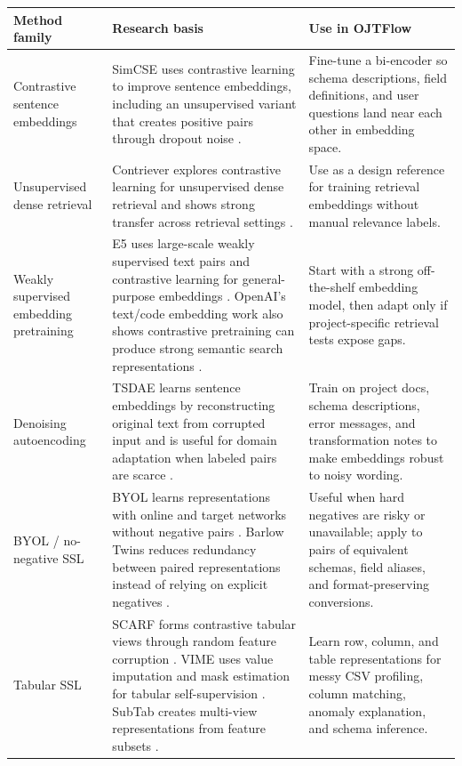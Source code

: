 \begin{longtable}{p{}p{}p{}}
\toprule
\textbf{Method family} & \textbf{Research basis} & \textbf{Use in OJTFlow} \\
\midrule
Contrastive sentence embeddings & SimCSE uses contrastive learning to improve sentence embeddings, including an unsupervised variant that creates positive pairs through dropout noise \cite{gao2021simcse}. & Fine-tune a bi-encoder so schema descriptions, field definitions, and user questions land near each other in embedding space. \\
\addlinespace
Unsupervised dense retrieval & Contriever explores contrastive learning for unsupervised dense retrieval and shows strong transfer across retrieval settings \cite{izacard2021contriever}. & Use as a design reference for training retrieval embeddings without manual relevance labels. \\
\addlinespace
Weakly supervised embedding pretraining & E5 uses large-scale weakly supervised text pairs and contrastive learning for general-purpose embeddings \cite{wang2022e5}. OpenAI's text/code embedding work also shows contrastive pretraining can produce strong semantic search representations \cite{neelakantan2022textcode}. & Start with a strong off-the-shelf embedding model, then adapt only if project-specific retrieval tests expose gaps. \\
\addlinespace
Denoising autoencoding & TSDAE learns sentence embeddings by reconstructing original text from corrupted input and is useful for domain adaptation when labeled pairs are scarce \cite{wang2021tsdae}. & Train on project docs, schema descriptions, error messages, and transformation notes to make embeddings robust to noisy wording. \\
\addlinespace
BYOL / no-negative SSL & BYOL learns representations with online and target networks without negative pairs \cite{grill2020byol}. Barlow Twins reduces redundancy between paired representations instead of relying on explicit negatives \cite{zbontar2021barlow}. & Useful when hard negatives are risky or unavailable; apply to pairs of equivalent schemas, field aliases, and format-preserving conversions. \\
\addlinespace
Tabular SSL & SCARF forms contrastive tabular views through random feature corruption \cite{bahri2021scarf}. VIME uses value imputation and mask estimation for tabular self-supervision \cite{yoon2020vime}. SubTab creates multi-view representations from feature subsets \cite{uddin2021subtab}. & Learn row, column, and table representations for messy CSV profiling, column matching, anomaly explanation, and schema inference. \\
\bottomrule
\end{longtable}

